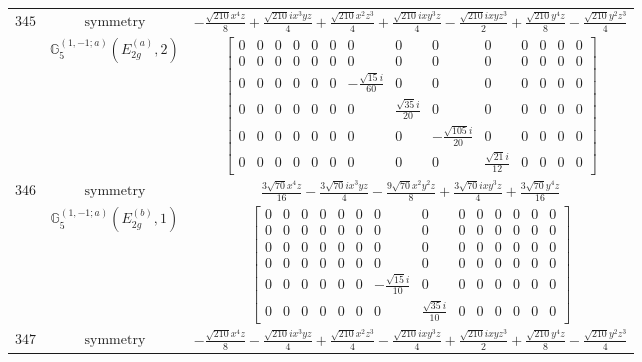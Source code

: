 \documentclass[fleqn,8pt,landscape]{jsarticle}
\begin{document}
\begin{longtable}{ccc}
$ 345 $ & $ \text{symmetry} $ & $ - \frac{\sqrt{210} x^{4} z}{8} + \frac{\sqrt{210} i x^{3} y z}{4} + \frac{\sqrt{210} x^{2} z^{3}}{4} + \frac{\sqrt{210} i x y^{3} z}{4} - \frac{\sqrt{210} i x y z^{3}}{2} + \frac{\sqrt{210} y^{4} z}{8} - \frac{\sqrt{210} y^{2} z^{3}}{4} $ \\
$  $ & $ \mathbb{G}_{5}^{(1,-1;a)}(E_{2g}^{(a)},2) $ & $ \begin{bmatrix} 0 & 0 & 0 & 0 & 0 & 0 & 0 & 0 & 0 & 0 & 0 & 0 & 0 & 0 \\ 0 & 0 & 0 & 0 & 0 & 0 & 0 & 0 & 0 & 0 & 0 & 0 & 0 & 0 \\ 0 & 0 & 0 & 0 & 0 & 0 & - \frac{\sqrt{15} i}{60} & 0 & 0 & 0 & 0 & 0 & 0 & 0 \\ 0 & 0 & 0 & 0 & 0 & 0 & 0 & \frac{\sqrt{35} i}{20} & 0 & 0 & 0 & 0 & 0 & 0 \\ 0 & 0 & 0 & 0 & 0 & 0 & 0 & 0 & - \frac{\sqrt{105} i}{20} & 0 & 0 & 0 & 0 & 0 \\ 0 & 0 & 0 & 0 & 0 & 0 & 0 & 0 & 0 & \frac{\sqrt{21} i}{12} & 0 & 0 & 0 & 0 \end{bmatrix} $ \\ \hline
$ 346 $ & $ \text{symmetry} $ & $ \frac{3 \sqrt{70} x^{4} z}{16} - \frac{3 \sqrt{70} i x^{3} y z}{4} - \frac{9 \sqrt{70} x^{2} y^{2} z}{8} + \frac{3 \sqrt{70} i x y^{3} z}{4} + \frac{3 \sqrt{70} y^{4} z}{16} $ \\
$  $ & $ \mathbb{G}_{5}^{(1,-1;a)}(E_{2g}^{(b)},1) $ & $ \begin{bmatrix} 0 & 0 & 0 & 0 & 0 & 0 & 0 & 0 & 0 & 0 & 0 & 0 & 0 & 0 \\ 0 & 0 & 0 & 0 & 0 & 0 & 0 & 0 & 0 & 0 & 0 & 0 & 0 & 0 \\ 0 & 0 & 0 & 0 & 0 & 0 & 0 & 0 & 0 & 0 & 0 & 0 & 0 & 0 \\ 0 & 0 & 0 & 0 & 0 & 0 & 0 & 0 & 0 & 0 & 0 & 0 & 0 & 0 \\ 0 & 0 & 0 & 0 & 0 & 0 & - \frac{\sqrt{15} i}{10} & 0 & 0 & 0 & 0 & 0 & 0 & 0 \\ 0 & 0 & 0 & 0 & 0 & 0 & 0 & \frac{\sqrt{35} i}{10} & 0 & 0 & 0 & 0 & 0 & 0 \end{bmatrix} $ \\ \hline
$ 347 $ & $ \text{symmetry} $ & $ - \frac{\sqrt{210} x^{4} z}{8} - \frac{\sqrt{210} i x^{3} y z}{4} + \frac{\sqrt{210} x^{2} z^{3}}{4} - \frac{\sqrt{210} i x y^{3} z}{4} + \frac{\sqrt{210} i x y z^{3}}{2} + \frac{\sqrt{210} y^{4} z}{8} - \frac{\sqrt{210} y^{2} z^{3}}{4} $ \\

\end{longtable}
\end{document}
